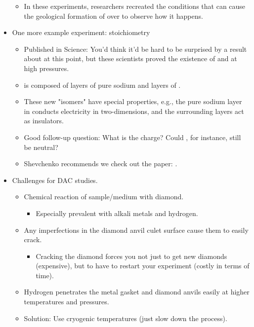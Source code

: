 \documentclass[../notes.tex]{subfiles}
\begin{document}
\begin{itemize}
\begin{itemize}
        \item In these experiments, researchers recreated the conditions that can cause the geological formation of  over  to observe how it happens.
    \end{itemize}
    \item One more example experiment:  stoichiometry
    \begin{itemize}
        \item Published in Science: You'd think it'd be hard to be surprised by a result about  at this point, but these scientists proved the existence of  and  at high pressures.
        \item {} is composed of layers of pure sodium and layers of .
        \item These new "isomers" have special properties, e.g., the pure sodium layer in  conducts electricity in two-dimensions, and the surrounding  layers act as insulators.
        \item Good follow-up question: What is the charge? Could , for instance, still be neutral?
        \item Shevchenko recommends we check out the paper: \textcite{bib:NaClStoichiometry}.
    \end{itemize}
    \item Challenges for DAC studies.
    \begin{itemize}
        \item Chemical reaction of sample/medium with diamond.
        \begin{itemize}
            \item Especially prevalent with alkali metals and hydrogen.
        \end{itemize}
        \item Any imperfections in the diamond anvil culet surface cause them to easily crack.
        \begin{itemize}
            \item Cracking the diamond forces you not just to get new diamonds (expensive), but to have to restart your experiment (costly in terms of time).
        \end{itemize}
        \item Hydrogen penetrates the metal gasket and diamond anvils easily at higher temperatures and pressures.
        \item Solution: Use cryogenic temperatures (just slow down the process).
        \begin{itemize}

\end{itemize}
\end{itemize}
\end{itemize}
\end{document}
